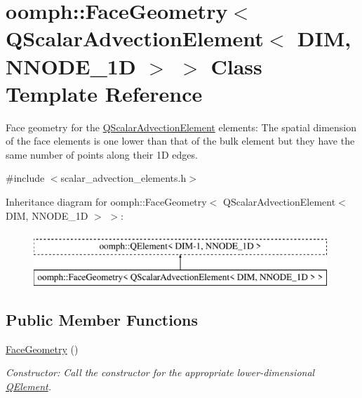\hypertarget{classoomph_1_1FaceGeometry_3_01QScalarAdvectionElement_3_01DIM_00_01NNODE__1D_01_4_01_4}{}\section{oomph\+:\+:Face\+Geometry$<$ Q\+Scalar\+Advection\+Element$<$ D\+IM, N\+N\+O\+D\+E\+\_\+1D $>$ $>$ Class Template Reference}
\label{classoomph_1_1FaceGeometry_3_01QScalarAdvectionElement_3_01DIM_00_01NNODE__1D_01_4_01_4}


Face geometry for the \hyperlink{classoomph_1_1QScalarAdvectionElement}{Q\+Scalar\+Advection\+Element} elements\+: The spatial dimension of the face elements is one lower than that of the bulk element but they have the same number of points along their 1D edges.  




{\ttfamily \#include $<$scalar\+\_\+advection\+\_\+elements.\+h$>$}

Inheritance diagram for oomph\+:\+:Face\+Geometry$<$ Q\+Scalar\+Advection\+Element$<$ D\+IM, N\+N\+O\+D\+E\+\_\+1D $>$ $>$\+:\begin{figure}[H]
\begin{center}
\leavevmode
\includegraphics[height=2.000000cm]{classoomph_1_1FaceGeometry_3_01QScalarAdvectionElement_3_01DIM_00_01NNODE__1D_01_4_01_4}
\end{center}
\end{figure}
\subsection*{Public Member Functions}
\begin{DoxyCompactItemize}
\item 
\hyperlink{classoomph_1_1FaceGeometry_3_01QScalarAdvectionElement_3_01DIM_00_01NNODE__1D_01_4_01_4_aed9989bb8d8caab5b5571cf1a50d518e}{Face\+Geometry} ()
\begin{DoxyCompactList}\small\item\em Constructor\+: Call the constructor for the appropriate lower-\/dimensional \hyperlink{classoomph_1_1QElement}{Q\+Element}. \end{DoxyCompactList}\end{DoxyCompactItemize}



